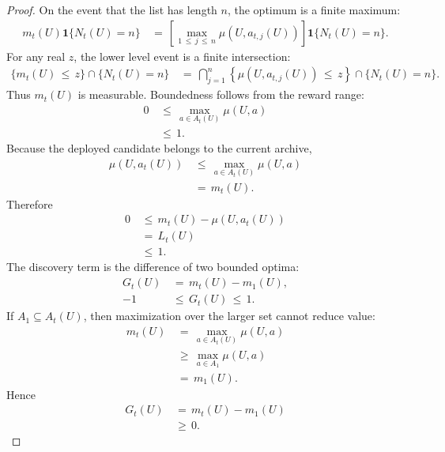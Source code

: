 \documentclass{article} %
\begin{document}
\begin{proof}
On the event that the list has length \(n\), the optimum is a finite maximum:
\begin{align}
\label{eq:app-fifth-mt-event}
m_t(U)\mathbf{1}\{N_t(U)=n\}
&\,=\,
\left[
\max_{1\,\le\, j\,\le\, n}
\mu\!\left(U,a_{t,j}(U)\right)
\right]
\mathbf{1}\{N_t(U)=n\}.
\end{align}
For any real \(z\), the lower level event is a finite intersection:
\begin{align}
\label{eq:app-fifth-meas-level}
\{m_t(U)\,\le\, z\}\cap\{N_t(U)=n\}
&\,=\,
\bigcap_{j=1}^{n}
\left\{
\mu\!\left(U,a_{t,j}(U)\right)\,\le\, z
\right\}
\cap
\{N_t(U)=n\}.
\end{align}
Thus \(m_t(U)\) is measurable.  Boundedness follows from the reward range:
\begin{align}
\label{eq:app-fifth-mt-range-proof}
0
&\,\le\,
\max_{a\in A_t(U)}\mu(U,a)
\\
&\,\le\,
1.
\end{align}
Because the deployed candidate belongs to the current archive,
\begin{align}
\label{eq:app-fifth-lt-nonnegative-proof}
\mu(U,a_t(U))
&\,\le\,
\max_{a\in A_t(U)}\mu(U,a)
\\
&\,=\,
m_t(U).
\end{align}
Therefore
\begin{align}
\label{eq:app-fifth-lt-range-proof}
0
&\,\le\,
m_t(U)-\mu(U,a_t(U))
\\
&\,=\,
L_t(U)
\\
&\,\le\,
1.
\end{align}
The discovery term is the difference of two bounded optima:
\begin{align}
\label{eq:app-fifth-gt-range-proof}
G_t(U)
&\,=\,
m_t(U)-m_1(U),
\\
-1
&\,\le\,
G_t(U)
\,\le\,
1.
\end{align}
If \(A_1\subseteq A_t(U)\), then maximization over the larger set cannot reduce value:
\begin{align}
\label{eq:app-fifth-append-proof}
m_t(U)
&\,=\,
\max_{a\in A_t(U)}\mu(U,a)
\\
&\,\ge\,
\max_{a\in A_1}\mu(U,a)
\\
&\,=\,
m_1(U).
\end{align}
Hence
\begin{align}
\label{eq:app-fifth-append-gt-proof}
G_t(U)
&\,=\,
m_t(U)-m_1(U)
\\
&\,\ge\,
0.
\end{align}
\end{proof}
\end{document}
